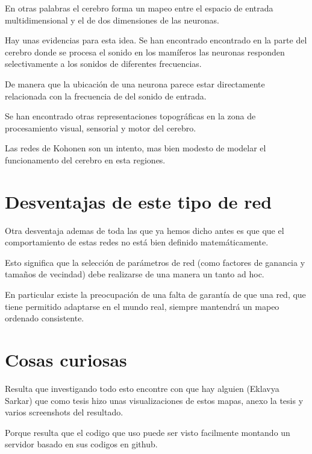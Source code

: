 \documentclass[fleqn, journal, onecolumn]{IEEEtran}             %
\theoremstyle{break}                                            %
\begin{document}
    En otras palabras el cerebro forma un mapeo entre el espacio de entrada 
    multidimensional y el de dos dimensiones de las neuronas.
    
    Hay unas evidencias para esta idea. Se han encontrado encontrado en la
    parte del cerebro donde se procesa el sonido en los mamíferos las neuronas 
    responden selectivamente a los sonidos de diferentes frecuencias. 
    
    De manera que la ubicación de una neurona parece estar directamente relacionada con la 
    frecuencia de del sonido de entrada.

    Se han encontrado otras representaciones topográficas en la zona de procesamiento visual,
    sensorial y motor del cerebro.

    Las redes de Kohonen son un intento, mas bien modesto de modelar el funcionamento del
    cerebro en esta regiones.

  \section{Desventajas de este tipo de red}

    Otra desventaja ademas de toda las que ya hemos dicho antes es que que el comportamiento 
    de estas redes no está bien definido matemáticamente.
    
    Esto significa que la selección de parámetros de red (como factores de ganancia y tamaños de 
    vecindad) debe realizarse de una manera un tanto ad hoc. 
    
    En particular existe la preocupación de una falta de garantía de que una red, 
    que tiene permitido adaptarse en el mundo real, siempre mantendrá un mapeo ordenado consistente.

  \section{Cosas curiosas}

      Resulta que investigando todo esto encontre con que hay alguien (Eklavya Sarkar) que
      como tesis hizo unas visualizaciones de estos mapas, anexo la tesis y varios screenshots 
      del resultado.

      Porque resulta que el codigo que uso puede ser visto facilmente montando un servidor
      basado en sus codigos en github. \cite{Tesis}
\end{document}
